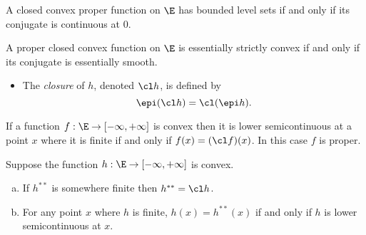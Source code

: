 \documentclass[../borwein-lewis_notes.tex]{subfiles}
\begin{document}
\begin{theorem}
A closed convex proper function on $\E$ has bounded level sets if 
and only if its conjugate is continuous at 0.
\label{4.2.4}
\end{theorem}
\begin{theorem}
A proper closed convex function on $\E$ is essentially strictly 
convex if and only if its conjugate is essentially smooth.
\label{4.2.5}
\end{theorem}
\begin{itemize}
\item The \textit{closure} of $h$, denoted $\cl h$, is defined by 
\begin{equation}
\epi(\cl h) = \cl(\epi h).
\label{4.2.6}
\end{equation}
\end{itemize}
\begin{proposition}
If a function $f:\E\to[-\infty, +\infty]$ is convex then it is lower
semicontinuous at a point $x$ where it is finite if and only if $f(x)
= (\cl f)(x)$. In this case $f$ is proper.
\label{4.2.7}
\end{proposition}
\begin{theorem}[4.2.8]
Suppose the function $h:\E\to[-\infty,+\infty]$ is convex.
\label{4.2.8}
\begin{enumerate}[(a)]
\item If $h^{**}$ is somewhere finite then $h^{**}=\cl h$.
\item For any point $x$ where $h$ is finite, $h(x)=h^{**}(x)$ if 
and only if $h$ is lower semicontinuous at $x$.
\end{enumerate}
\end{theorem}
\end{document}
